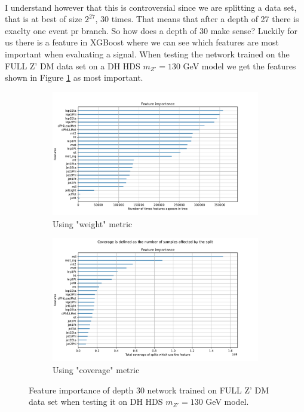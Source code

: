 \documentclass[14pt, a4paper]{book}
\begin{document}
\\ I understand however that this is controversial since we are splitting a data set, that is at best of size $2^{27}$, 30 times. That means that after a depth of 27 there is exaclty one event pr branch.
So how does a depth of 30 make sense? Luckily for us there is a feature in XGBoost where we can see which features are most important when evaluating a signal. 
When testing the network trained on the FULL Z' DM data set on a DH HDS $m_{Z'}=130$ GeV model we get the features shown in Figure \ref{fig:DBDT_feat} as most important. 
\graphicspath{{../../../Plots/XGBoost/FULL/DH_HDS_mZp_130/feature_importance}}
\begin{figure}[!ht]
	\centering
   \begin{subfigure}[b]{0.8\textwidth}
      \centering
      \includegraphics[width=1\textwidth]{weight.pdf}
      \caption{Using "weight" metric}
   \end{subfigure}
   \hfill
   \begin{subfigure}[b]{0.8\textwidth}
      \centering
      \includegraphics[width=1\textwidth]{total_cover.pdf}
      \caption{Using "coverage" metric}
   \end{subfigure}
   \caption{Feature importance of depth 30 network trained on FULL Z' DM data set when testing it on DH HDS $m_{Z'}=130$ GeV model.}\label{fig:DBDT_feat}
\end{figure}
\end{document}
